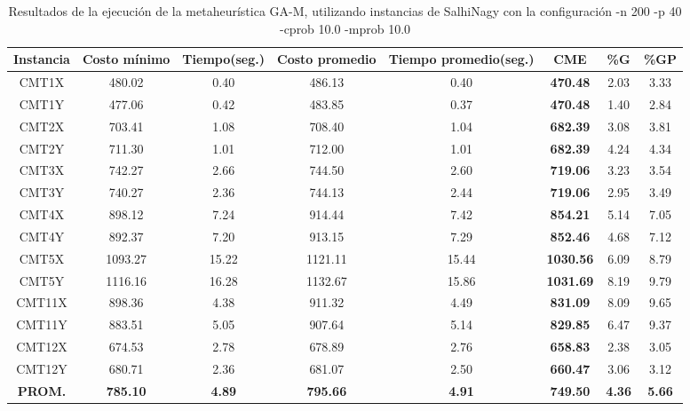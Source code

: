 \begin{table}[h]
\caption{Resultados de la ejecución de la metaheurística GA-M, utilizando instancias de SalhiNagy con la configuración -n 200 -p 40 -cprob 10.0 -mprob 10.0}
\centering
\small
\begin{tabular}{c c c c c c c c}
\hline\hline
Instancia & Costo mínimo & Tiempo(seg.) & Costo promedio & Tiempo promedio(seg.) & CME & \%G & \%GP \\ [0.5ex]
\hline
CMT1X & 480.02 & 0.40 & 
486.13 & 0.40 & \bf{470.48} & 
2.03 & 3.33\\CMT1Y & 477.06 & 0.42 & 
483.85 & 0.37 & \bf{470.48} & 
1.40 & 2.84\\CMT2X & 703.41 & 1.08 & 
708.40 & 1.04 & \bf{682.39} & 
3.08 & 3.81\\CMT2Y & 711.30 & 1.01 & 
712.00 & 1.01 & \bf{682.39} & 
4.24 & 4.34\\CMT3X & 742.27 & 2.66 & 
744.50 & 2.60 & \bf{719.06} & 
3.23 & 3.54\\CMT3Y & 740.27 & 2.36 & 
744.13 & 2.44 & \bf{719.06} & 
2.95 & 3.49\\CMT4X & 898.12 & 7.24 & 
914.44 & 7.42 & \bf{854.21} & 
5.14 & 7.05\\CMT4Y & 892.37 & 7.20 & 
913.15 & 7.29 & \bf{852.46} & 
4.68 & 7.12\\CMT5X & 1093.27 & 15.22 & 
1121.11 & 15.44 & \bf{1030.56} & 
6.09 & 8.79\\CMT5Y & 1116.16 & 16.28 & 
1132.67 & 15.86 & \bf{1031.69} & 
8.19 & 9.79\\CMT11X & 898.36 & 4.38 & 
911.32 & 4.49 & \bf{831.09} & 
8.09 & 9.65\\CMT11Y & 883.51 & 5.05 & 
907.64 & 5.14 & \bf{829.85} & 
6.47 & 9.37\\CMT12X & 674.53 & 2.78 & 
678.89 & 2.76 & \bf{658.83} & 
2.38 & 3.05\\CMT12Y & 680.71 & 2.36 & 
681.07 & 2.50 & \bf{660.47} & 
3.06 & 3.12\\\bf{PROM.} & 
\bf{785.10} & \bf{4.89} & \bf{795.66} & \bf{4.91} & \bf{749.50} & \bf{4.36} & \bf{5.66}\\[1ex]\hline
\end{tabular}
\label{table:nonlin}
\end{table} 

